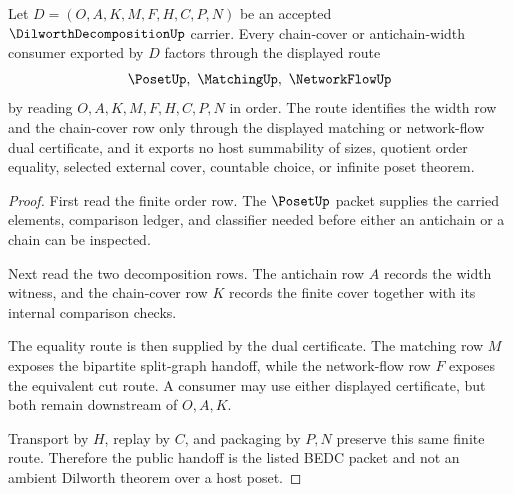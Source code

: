 \begin{theorem}
\label{thm:dilworth-decomposition-chain-antichain-handoff}
Let $D=(O,A,K,M,F,H,C,P,N)$ be an accepted $\DilworthDecompositionUp$ carrier. Every chain-cover or antichain-width consumer exported by $D$ factors through the displayed route
$$
\PosetUp,\ \MatchingUp,\ \NetworkFlowUp
$$
by reading $O,A,K,M,F,H,C,P,N$ in order. The route identifies the width row and the chain-cover row only through the displayed matching or network-flow dual certificate, and it exports no host summability of sizes, quotient order equality, selected external cover, countable choice, or infinite poset theorem.
\end{theorem}
\begin{proof}
First read the finite order row. The $\PosetUp$ packet supplies the carried elements, comparison ledger, and classifier needed before either an antichain or a chain can be inspected.

Next read the two decomposition rows. The antichain row $A$ records the width witness, and the chain-cover row $K$ records the finite cover together with its internal comparison checks.

The equality route is then supplied by the dual certificate. The matching row $M$ exposes the bipartite split-graph handoff, while the network-flow row $F$ exposes the equivalent cut route. A consumer may use either displayed certificate, but both remain downstream of $O,A,K$.

Transport by $H$, replay by $C$, and packaging by $P,N$ preserve this same finite route. Therefore the public handoff is the listed BEDC packet and not an ambient Dilworth theorem over a host poset.
\end{proof}


\begin{closurestatus}{\DilworthDecompositionUp}
  \theoryclosure{\seedClosure}
  \formalstatus{\unformalizedV}
\end{closurestatus}
